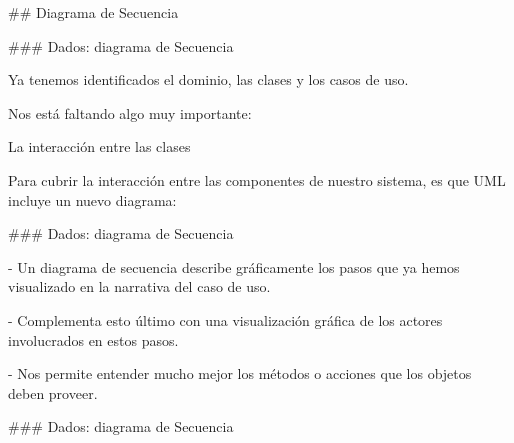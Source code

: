 ## Diagrama de Secuencia

### Dados: diagrama de Secuencia


Ya tenemos identificados el dominio, las clases y los casos de uso.\newline

\pause

Nos está faltando algo muy importante:

\begin{rboxx}{}
La interacción entre las clases
\end{rboxx}

\pause

Para cubrir la interacción entre las componentes de nuestro sistema, es que UML
incluye un nuevo diagrama:

\begin{rboxx}{}
\end{rboxx}


### Dados: diagrama de Secuencia


- Un diagrama de secuencia describe gráficamente los pasos que ya hemos visualizado en la narrativa
del caso de uso.

- Complementa esto último con una visualización gráfica de los actores involucrados en estos pasos.

- Nos permite entender mucho mejor los métodos o acciones que los objetos deben proveer.

### Dados: diagrama de Secuencia


